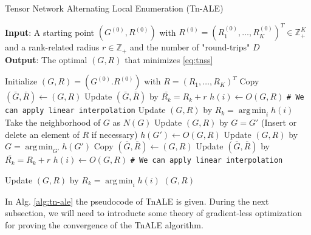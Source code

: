 \documentclass[11pt,a4paper,openright,oneside]{book}
\numberwithin{equation}{section}
\newcommand{\refeq}[1]{\cref{#1}}
\DeclareMathOperator*{\argmin}{arg\,min}
\begin{document}
{\begin{algorithm}[h]
    \caption{Tensor Network Alternating Local Enumeration (Tn-ALE)}

    \hspace*{\algorithmicindent} \textbf{Input}: A starting point $(G^{(0)}, R^{(0)})$ with $R^{(0)} = (R_1^{(0)}, \dots, R_K^{(0)})^T \in \mathbb{Z}_+^K$ 
    and a rank-related radius $r \in \mathbb{Z}_+$ and the number of "round-trips" $D$ \\ 
    \hspace*{\algorithmicindent} \textbf{Output}: The optimal $(G, R)$ that minimizes \refeq{eq:tnss}

    \begin{algorithmic}[1]
        \State Initialize $(G, R) = (G^{(0)}. R^{(0)})$ with $R = (R_1, \dots, R_K)^T$
                    \State Copy $(\bar{G}, \bar{R}) \leftarrow (G, R)$
                    \State Update $(\bar{G}, \bar{R})$ by $\bar{R_k} = R_k + r$
                    \State $h(i) \leftarrow O(G, R)$ \qquad \verb/# We can apply linear interpolation/
                \EndFor
                \State Update $(G, R)$ by $R_k = \argmin_i h(i)$
            \EndFor
            \State Take the neighborhood of $G$ as $N(G)$
                \State Update $(G, R)$ by $G = G'$ (Insert or delete an element of $R$ if necessary)
                \State $h(G') \leftarrow O(G, R)$
            \EndFor
            \State Update $(G, R)$ by $G = \argmin_{G'} h(G')$
                    \State Copy $(\bar{G}, \bar{R}) \leftarrow (G, R)$
                    \State Update $(\bar{G}, \bar{R})$ by $\bar{R_k} = R_k + r$
                    \State $h(i) \leftarrow O(G, R)$ \qquad  \verb/# We can apply linear interpolation/

                \EndFor
                \State Update $(G, R)$ by $R_k = \argmin_i h(i)$
            \EndFor
        \EndFor
        \State \Return $(G, R)$

    \end{algorithmic}

    \label{alg:tn-ale}
\end{algorithm}

In Alg. \ref{alg:tn-ale} the pseudocode of \gls{TnALE} is given. During the next subsection, we will need to introducte some theory of
gradient-less optimization for proving the convergence of the \gls{TnALE} algorithm.

}
\end{document}
